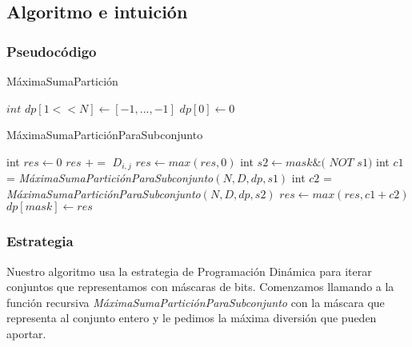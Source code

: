 \subsection{Algoritmo e intuición}

\subsubsection*{Pseudocódigo}

\begin{algorithm}[H]
    \caption{MáximaSumaPartición}
    $int$  $\mathit{dp[1<<N]} \gets [-1,...,-1]$ \;
    $\mathit{dp[0]} \gets 0$ \;
\end{algorithm}

\begin{algorithm}[H]
    \caption{MáximaSumaParticiónParaSubconjunto}
     {
    }{
    int $\mathit{res} \gets 0$ \;
     {
         {
             {
                $res$ $+=$ $D_{i,j}$
            }
        }
    }
    $res \gets max(res, 0)$ \;
     {
        int $s2 \gets mask \& ($ $NOT$ $ s1)$ \;
        int $c1$ = \emph{MáximaSumaParticiónParaSubconjunto}$(N, D, dp, s1)$ \;
        int $c2$ = \emph{MáximaSumaParticiónParaSubconjunto}$(N, D, dp, s2)$ \;
        $res \gets max(res, c1+c2)$ \;
    }
    $dp[mask] \gets res$ \;
    }
\end{algorithm}
\bigskip

\subsubsection*{Estrategia}

Nuestro algoritmo usa la estrategia de Programación Dinámica para iterar
conjuntos que representamos con máscaras de bits. Comenzamos llamando a la
función recursiva \emph{MáximaSumaParticiónParaSubconjunto} con la máscara que
representa al conjunto entero y le pedimos la máxima diversión que pueden
aportar.

